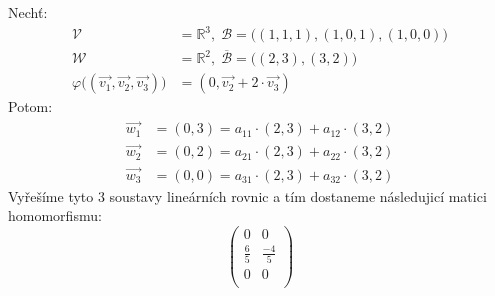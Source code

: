 \begin{example}
    Nechť:
    \begin{align*}
        \mathcal{V} &= \mathbb{R}^3,\;\mathcal{B} = \big((1,1,1), (1,0,1), (1,0,0) \big)\\
        \mathcal{W} &= \mathbb{R}^2,\;\overline{\mathcal{B}} = \big((2,3), (3,2) \big)\\
        \varphi \big((\vec{v_1}, \vec{v_2}, \vec{v_3})\big) &= (0, \vec{v_2} + 2\cdot \vec{v_3})
    \end{align*}
    Potom:
    \begin{align*}
        \vec{w_1} &= (0, 3) = a_{11} \cdot (2, 3) + a_{12}\cdot (3,2)\\
        \vec{w_2} &= (0, 2) = a_{21} \cdot (2, 3) + a_{22}\cdot (3,2)\\
        \vec{w_3} &= (0, 0) = a_{31} \cdot (2, 3) + a_{32}\cdot (3,2)
    \end{align*}
    Vyřešíme tyto 3 soustavy lineárních rovnic a tím dostaneme následujicí matici homomorfismu:
    $$\begin{pmatrix}
       0 & 0\\
       \frac{6}{5} & \frac{-4}{5}\\
       0 & 0\\
    \end{pmatrix}$$
\end{example}